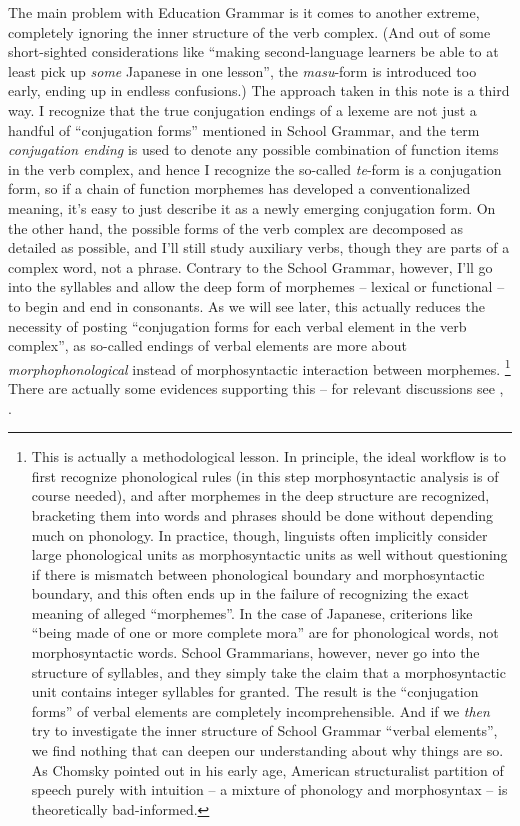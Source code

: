 \documentclass[UTF8, a4paper, oneside, scheme=plain]{ctexart}
\newcommand{\corpus}[1]{\emph{#1}}
\begin{document}
The main problem with Education Grammar is it comes to another extreme,
completely ignoring the inner structure of the verb complex.
(And out of some short-sighted considerations like 
``making second-language learners be able to at least pick up \emph{some} Japanese in one lesson'',
the \corpus{masu}-form is introduced too early,
ending up in endless confusions.)
The approach taken in this note is a third way.
I recognize that the true conjugation endings of a lexeme 
are not just a handful of ``conjugation forms'' mentioned in School Grammar,
and the term \corpus{conjugation ending} is used to denote 
any possible combination of function items in the verb complex,
and hence I recognize the so-called \corpus{te}-form is a conjugation form,
so if a chain of function morphemes has developed a conventionalized meaning,
it's easy to just describe it as a newly emerging conjugation form.
On the other hand,
the possible forms of the verb complex are decomposed as detailed as possible,
and I'll still study auxiliary verbs,
though they are parts of a complex word, not a phrase.
Contrary to the School Grammar, however,
I'll go into the syllables and allow the deep form of morphemes -- lexical or functional --
to begin and end in consonants.
As we will see later,
this actually reduces the necessity of posting 
``conjugation forms for each verbal element in the verb complex'',
as so-called endings of verbal elements 
are more about \emph{morphophonological} instead of morphosyntactic interaction 
between morphemes.%
\footnote{
    This is actually a methodological lesson.
    In principle, the ideal workflow is to first recognize phonological rules
    (in this step morphosyntactic analysis is of course needed),
    and after morphemes in the deep structure are recognized,
    bracketing them into words and phrases should be done
    without depending much on phonology.
    In practice, though, linguists often implicitly 
    consider large phonological units as morphosyntactic units as well 
    without questioning if there is mismatch between phonological boundary and morphosyntactic boundary,
    and this often ends up in the failure of recognizing the exact meaning of alleged ``morphemes''.
    In the case of Japanese,
    criterions like ``being made of one or more complete mora''
    are for phonological words, not morphosyntactic words.
    School Grammarians, however, never go into the structure of syllables,
    and they simply take the claim that a morphosyntactic unit contains integer syllables for granted.
    The result is the ``conjugation forms'' of verbal elements are completely incomprehensible.
    And if we \emph{then} try to investigate the inner structure of School Grammar ``verbal elements'',
    we find nothing that can deepen our understanding about why things are so.
    As Chomsky pointed out in his early age,
    American structuralist partition of speech purely with intuition 
    -- a mixture of phonology and morphosyntax --
    is theoretically bad-informed.
}
There are actually some evidences supporting this -- 
for relevant discussions see , .
\end{document}
